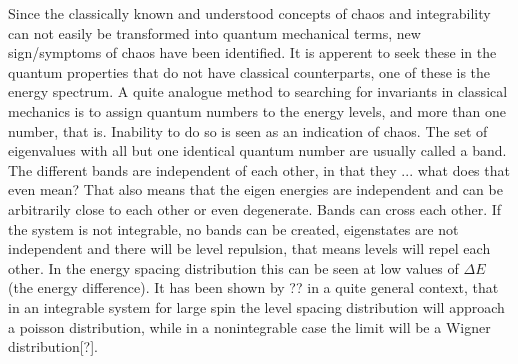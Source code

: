 Since the classically known and understood concepts of chaos and integrability can not easily be transformed into quantum mechanical terms, new sign/symptoms of chaos have been identified. 
It is apperent to seek these in the quantum properties that do not have classical counterparts, one of these is the energy spectrum.
A quite analogue method to searching for invariants in classical mechanics is to assign quantum numbers to the energy levels, and more than one number, that is.
Inability to do so is seen as an indication of chaos.
The set of eigenvalues with all but one identical quantum number are usually called a band.
The different bands are independent of each other, in that they ... what does that even mean?
That also means that the eigen energies are independent and can be arbitrarily close to each other or even degenerate.
Bands can cross each other.
If the system is not integrable, no bands can be created, eigenstates are not independent and there will be level repulsion, that means levels will repel each other.
In the energy spacing distribution this can be seen at low values of $\Delta E$ (the energy difference).
It has been shown by ?? in a quite general context, that in an integrable system for large spin the level spacing distribution will approach a poisson distribution, while in a nonintegrable case the limit will be a Wigner distribution[?].

